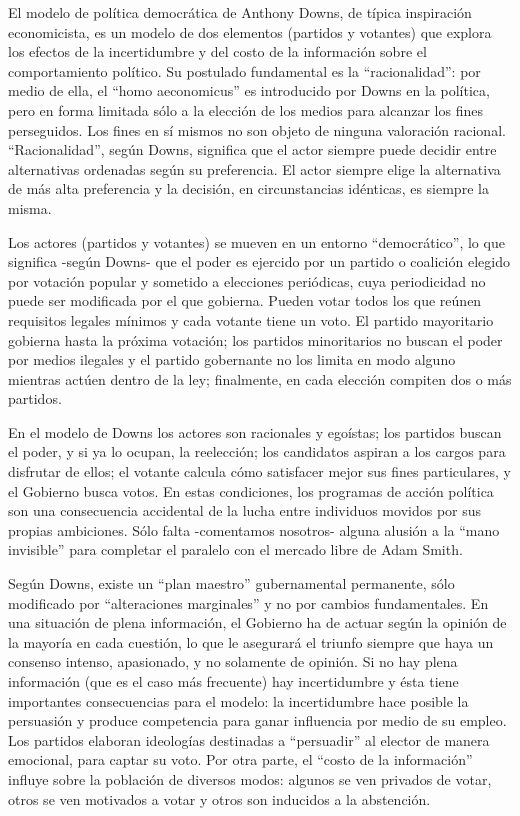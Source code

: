 \documentclass[
]{book}
\begin{document}
El modelo de política democrática de Anthony Downs, de típica inspiración economicista, es un modelo de dos elementos (partidos y votantes) que explora los efectos de la incertidumbre y del costo de la información sobre el comportamiento político. Su postulado fundamental es la ``racionalidad'': por medio de ella, el ``homo aeconomicus'' es introducido por Downs en la política, pero en forma limitada sólo a la elección de los medios para alcanzar los fines perseguidos. Los fines en sí mismos no son objeto de ninguna valoración racional. ``Racionalidad'', según Downs, significa que el actor siempre puede decidir entre alternativas ordenadas según su preferencia. El actor siempre elige la alternativa de más alta preferencia y la decisión, en circunstancias idénticas, es siempre la misma.

Los actores (partidos y votantes) se mueven en un entorno ``democrático'', lo que significa -según Downs- que el poder es ejercido por un partido o coalición elegido por votación popular y sometido a elecciones periódicas, cuya periodicidad no puede ser modificada por el que gobierna. Pueden votar todos los que reúnen requisitos legales mínimos y cada votante tiene un voto. El partido mayoritario gobierna hasta la próxima votación; los partidos minoritarios no buscan el poder por medios ilegales y el partido gobernante no los limita en modo alguno mientras actúen dentro de la ley; finalmente, en cada elección compiten dos o más partidos.

En el modelo de Downs los actores son racionales y egoístas; los partidos buscan el poder, y si ya lo ocupan, la reelección; los candidatos aspiran a los cargos para disfrutar de ellos; el votante calcula cómo satisfacer mejor sus fines particulares, y el Gobierno busca votos. En estas condiciones, los programas de acción política son una consecuencia accidental de la lucha entre individuos movidos por sus propias ambiciones. Sólo falta -comentamos nosotros- alguna alusión a la ``mano invisible'' para completar el paralelo con el mercado libre de Adam Smith.

Según Downs, existe un ``plan maestro'' gubernamental permanente, sólo modificado por ``alteraciones marginales'' y no por cambios fundamentales. En una situación de plena información, el Gobierno ha de actuar según la opinión de la mayoría en cada cuestión, lo que le asegurará el triunfo siempre que haya un consenso intenso, apasionado, y no solamente de opinión. Si no hay plena información (que es el caso más frecuente) hay incertidumbre y ésta tiene importantes consecuencias para el modelo: la incertidumbre hace posible la persuasión y produce competencia para ganar influencia por medio de su empleo. Los partidos elaboran ideologías destinadas a ``persuadir'' al elector de manera emocional, para captar su voto. Por otra parte, el ``costo de la información'' influye sobre la población de diversos modos: algunos se ven privados de votar, otros se ven motivados a votar y otros son inducidos a la abstención.
\end{document}
